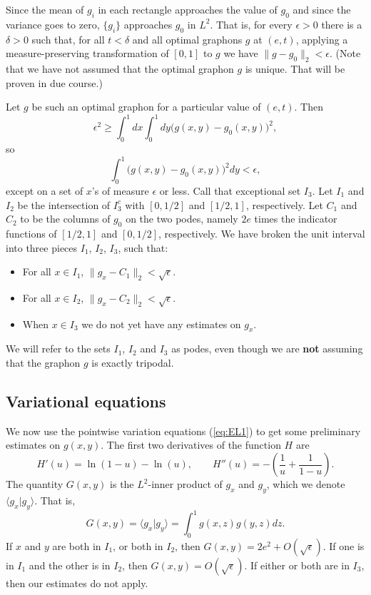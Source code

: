 \documentclass[12pt]{amsart}
\newcommand\be{\begin{equation}}
\newcommand\ee{\end{equation}}
\begin{document}
{Since the mean of $g_i$ in each rectangle approaches the value of $g_0$ and since the variance goes 
to zero, $\{g_i\}$ approaches $g_0$ in $L^2$.
 That is, for every 
$\epsilon >0$ there is a $\delta >0$ such that, for all $t<\delta$ and all optimal graphons $g$ at $(e,t)$, 
applying a measure-preserving transformation of $[0,1]$ to $g$ we have
$\|g-g_0\|_2 < \epsilon$.
(Note that we have not assumed that the optimal graphon $g$  
is unique. That will be proven in due course.) 

Let $g$ be such an optimal graphon for a particular value of  $(e,t)$. Then 
\be \epsilon^2 \ge \int_0^1 dx \int_0^1 dy \big ( g(x,y) - g_0(x,y) \big )^2, \ee
so 
\be \int_0^1  \big ( g(x,y) - g_0(x,y) \big )^2 dy < \epsilon, \ee
except on a set of $x$'s of measure $\epsilon$ or less. 
Call that exceptional set $I_3$. Let $I_1$ and 
$I_2$ be the intersection of $I_3^c$ with $[0, 1/2]$ and $[1/2, 1]$, respectively. Let
$C_1$ and $C_2$ to be the columns of $g_0$ on the two podes, namely $2e$ times the indicator functions 
of $[1/2, 1]$ and $[0,1/2]$, respectively. We have 
broken the unit interval into three pieces $I_1$, $I_2$, $I_3$, such that:
\begin{itemize}
\item For all $x \in I_1$, $\| g_x - C_1\|_2 < \sqrt{\epsilon}$.
\item For all $x \in I_2$, $\| g_x - C_2 \|_2 < \sqrt{\epsilon}$. 
\item When $x\in I_3$ we do not yet have any estimates on $g_x$.
\end{itemize}
We will refer to the sets $I_1$, $I_2$ and $I_3$ as podes, even though we are {\bf not} assuming that
the graphon $g$ is exactly tripodal. 

\subsection{Variational equations} We now use the pointwise variation equations (\ref{eq:EL1}) to get
some preliminary estimates on $g(x,y)$. The first two derivatives of the
function $H$ are
\be H'(u) = \ln(1-u) - \ln(u), \qquad H''(u) = - \left ( \frac{1}{u} + \frac{1}{1-u} \right ). \ee
The quantity $G(x,y)$ is the 
$L^2$-inner product of $g_x$ and $g_y$, which we denote 
$\langle g_x | g_y \rangle$. That is,
\be G(x,y) = \langle g_x | g_y \rangle = \int_0^1 g(x,z) g(y,z) dz. \ee
If $x$ and $y$ are both in $I_1$, 
or both in $I_2$, then $G(x,y) = 2e^2 + O(\sqrt{\epsilon})$. If one is 
in $I_1$ and the other is in $I_2$, then $G(x,y) = O(\sqrt{\epsilon})$. 
If either or both are in $I_3$, then our estimates do not apply. 

}
\end{document}
